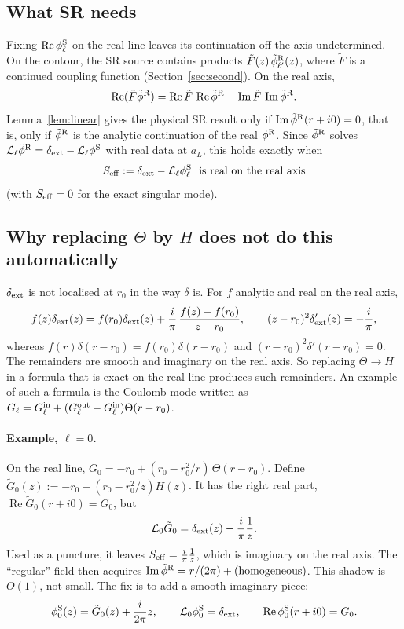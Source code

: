 \documentclass[11pt,a4paper]{article}
\renewcommand{\Re}{\operatorname{Re}}
\renewcommand{\Im}{\operatorname{Im}}
\newcommand{\dext}{\delta_{\rm ext}}
\newcommand{\Lop}{\mathcal{L}_\ell}
\newcommand{\phiS}{\phi^{\rm S}}
\newcommand{\phiR}{\phi^{\rm R}}
\begin{document}
\subsection{What SR needs}
Fixing $\Re\phiS_\ell$ on the real line leaves its continuation off the axis undetermined.
On the contour, the SR source contains products $\tilde F(z)\,\tilde\phi^{\rm R}_{\ell'}(z)$, where $\tilde F$ is a continued coupling function (Section~\ref{sec:second}).
On the real axis,
\begin{equation}
\Re(\tilde F\tilde\phi^{\rm R})=\Re\tilde F\,\Re\tilde\phi^{\rm R}-\Im\tilde F\,\Im\tilde\phi^{\rm R}.
\end{equation}
Lemma~\ref{lem:linear} gives the physical SR result only if $\Im\tilde\phi^{\rm R}(r+i0)=0$, that is, only if $\tilde\phi^{\rm R}$ is the analytic continuation of the real $\phiR$.
Since $\tilde\phi^{\rm R}$ solves $\Lop\tilde\phi^{\rm R}=\dext-\Lop\phiS$ with real data at $a_L$, this holds exactly when
\begin{equation}
S_{\rm eff}:=\dext-\Lop\phiS_\ell\ \text{ is real on the real axis}
\label{eq:C2}
\end{equation}
(with $S_{\rm eff}=0$ for the exact singular mode).

\subsection{Why replacing $\Theta$ by $H$ does not do this automatically}
$\dext$ is not localised at $r_0$ in the way $\delta$ is.
For $f$ analytic and real on the real axis,
\begin{equation}
f(z)\dext(z)=f(r_0)\dext(z)+\frac{i}{\pi}\,\frac{f(z)-f(r_0)}{z-r_0},\qquad (z-r_0)^2\dext'(z)=-\frac{i}{\pi},
\end{equation}
whereas $f(r)\delta(r-r_0)=f(r_0)\delta(r-r_0)$ and $(r-r_0)^2\delta'(r-r_0)=0$.
The remainders are smooth and imaginary on the real axis.
So replacing $\Theta\to H$ in a formula that is exact on the real line produces such remainders.
An example of such a formula is the Coulomb mode written as $G_\ell=G_\ell^{\rm in}+(G_\ell^{\rm out}-G_\ell^{\rm in})\Theta(r-r_0)$.

\paragraph{Example, $\ell=0$.}
On the real line, $G_0=-r_0+(r_0-r_0^2/r)\,\Theta(r-r_0)$.
Define $\tilde G_0(z):=-r_0+(r_0-r_0^2/z)H(z)$.
It has the right real part, $\Re\tilde G_0(r+i0)=G_0$, but
\begin{equation}
\mathcal L_0\tilde G_0=\dext(z)-\frac{i}{\pi}\frac{1}{z}.
\end{equation}
Used as a puncture, it leaves $S_{\rm eff}=\frac{i}{\pi}\frac1z$, which is imaginary on the real axis.
The ``regular'' field then acquires $\Im\tilde\phi^{\rm R}=r/(2\pi)+(\text{homogeneous})$.
This shadow is $O(1)$, not small.
The fix is to add a smooth imaginary piece:
\begin{equation}
\phiS_0(z)=\tilde G_0(z)+\frac{i}{2\pi}z,\qquad \mathcal L_0\phiS_0=\dext,\qquad \Re\phiS_0(r+i0)=G_0 .
\end{equation}
\end{document}
